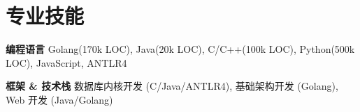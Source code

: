 \documentclass[letterpaper,10pt]{article}
\newcommand{\resumeItem}[2]{
  \item\small{
    \textbf{\:#1}{ #2 \vspace{-4pt}}
  }
}
\begin{document}
    
        
\section{专业技能}
  	\resumeItem
      {编程语言}
      {Golang(170k LOC), Java(20k LOC), C/C++(100k LOC), Python(500k LOC), JavaScript, ANTLR4}
    \resumeItem
      {框架 \& 技术栈}
      {数据库内核开发 (C/Java/ANTLR4), 基础架构开发 (Golang), Web 开发 (Java/Golang)}


\end{document}
